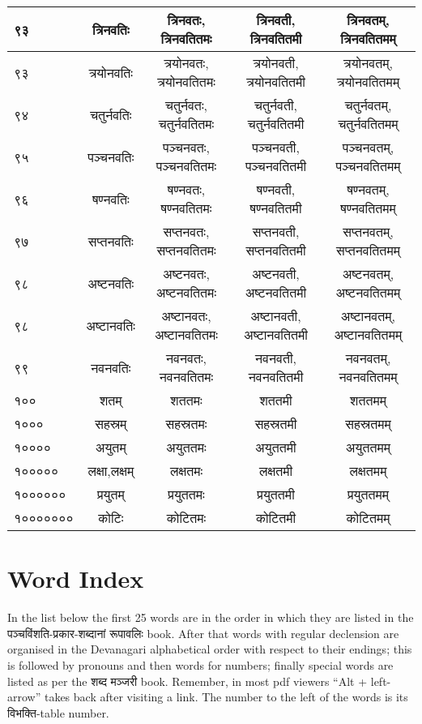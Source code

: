 \documentclass[leqno,fleqn,12pt]{article}%
\makeatletter
\newcounter{wordcount}
\newcommand{\nextWord}[1]{\refstepcounter{wordcount}(\devanumber\c@wordcount) \label{#1} \relax}
\newcommand{\wref}[1]{(\devanumber{\getrefnumber{#1}}) \relax}
\makeatother
\begin{document}
\begin{center}
\begin{supertabular}{|lc|c|c|c|}
९३ & त्रिनवतिः & त्रिनवतः, त्रिनवतितमः & त्रिनवती, त्रिनवतितमी & त्रिनवतम्, त्रिनवतितमम् \\ \hline 
९३ & त्रयोनवतिः & त्रयोनवतः, त्रयोनवतितमः & त्रयोनवती, त्रयोनवतितमी & त्रयोनवतम्, त्रयोनवतितमम् \\ \hline 
९४ & चतुर्नवतिः & चतुर्नवतः, चतुर्नवतितमः & चतुर्नवती, चतुर्नवतितमी & चतुर्नवतम्, चतुर्नवतितमम् \\ \hline 
९५ & पञ्चनवतिः & पञ्चनवतः, पञ्चनवतितमः & पञ्चनवती, पञ्चनवतितमी & पञ्चनवतम्, पञ्चनवतितमम् \\ \hline 
९६ & षण्नवतिः & षण्नवतः, षण्नवतितमः & षण्नवती, षण्नवतितमी & षण्नवतम्, षण्नवतितमम् \\ \hline 
९७ & सप्तनवतिः & सप्तनवतः, सप्तनवतितमः & सप्तनवती, सप्तनवतितमी & सप्तनवतम्, सप्तनवतितमम् \\ \hline 
९८ & अष्टनवतिः & अष्टनवतः, अष्टनवतितमः & अष्टनवती, अष्टनवतितमी & अष्टनवतम्, अष्टनवतितमम् \\ \hline 
९८ & अष्टानवतिः & अष्टानवतः, अष्टानवतितमः & अष्टानवती, अष्टानवतितमी & अष्टानवतम्, अष्टानवतितमम् \\ \hline 
९९ & नवनवतिः & नवनवतः, नवनवतितमः & नवनवती, नवनवतितमी & नवनवतम्, नवनवतितमम् \\ \hline 
१०० & शतम् & शततमः & शततमी & शततमम् \\ \hline 
१००० & सहस्रम् & सहस्रतमः & सहस्रतमी & सहस्रतमम् \\ \hline 
१०००० & अयुतम् & अयुततमः & अयुततमी & अयुततमम् \\ \hline 
१००००० & लक्षा,लक्षम् & लक्षतमः & लक्षतमी & लक्षतमम् \\ \hline 
१०००००० & प्रयुतम् & प्रयुततमः & प्रयुततमी & प्रयुततमम् \\ \hline 
१००००००० & कोटिः & कोटितमः & कोटितमी & कोटितमम् \\ \hline 
\end{supertabular} 
\end{center} 



\clearpage
\section{Word Index}
In the list below the first 25 words are in the order in which they are listed in the पञ्चविंशति-प्रकार-शब्दानां रूपावलिः book. After that words with regular declension are organised in the Devanagari alphabetical order with respect to their endings; this is followed by pronouns and then words for numbers; finally special words are listed as per the शब्द मञ्जरी book. Remember, in most pdf viewers ``Alt + left-arrow'' takes back after visiting a link. The number to the left of the words is its विभक्ति-table number.
\end{document}
